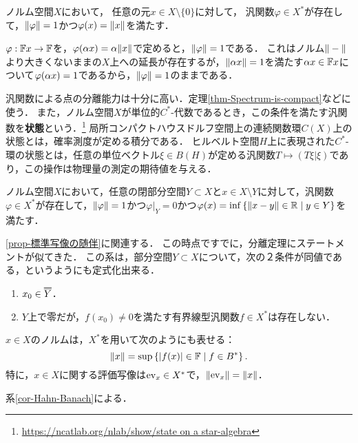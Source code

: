 \documentclass[uplatex,dvipdfmx]{jsreport}
\begin{document}
\begin{corollary}[汎関数の構成]\label{cor-Hahn-Banach}
    ノルム空間$X$において，
    任意の元$x\in X\setminus\{0\}$に対して，
    汎関数$\varphi\in X^*$が存在して，$\|\varphi\|=1$かつ$\varphi(x)=\|x\|$を満たす．
\end{corollary}
\begin{Proof}
    $\varphi:\mathbb{F} x\to\mathbb{F}$を，$\varphi(\alpha x)=\alpha\|x\|$で定めると，$\|\varphi\|=1$である．
    これはノルム$\|-\|$より大きくないままの$X$上への延長が存在するが，$\|\alpha x\|=1$を満たす$\alpha x\in\mathbb{F} x$について$\varphi(\alpha x)=1$であるから，$\|\varphi\|=1$のままである．
\end{Proof}
\begin{remarks}[state]
    汎関数による点の分離能力は十分に高い．定理\ref{thm-Spectrum-is-compact}などに使う．
    また，ノルム空間$X$が単位的$C^*$-代数であるとき，この条件を満たす汎関数を\textbf{状態}という．\footnote{\url{https://ncatlab.org/nlab/show/state on a star-algebra}}
    局所コンパクトハウスドルフ空間上の連続関数環$C(X)$上の状態とは，確率測度が定める積分である．
    ヒルベルト空間$H$上に表現された$C^*$-環の状態とは，任意の単位ベクトル$\xi\in B(H)$が定める汎関数$T\mapsto(T\xi|\xi)$であり，この操作は物理量の測定の期待値を与える．
\end{remarks}

\begin{corollary}
    ノルム空間$X$において，任意の閉部分空間$Y\subset X$と$x\in X\setminus Y$に対して，汎関数$\varphi\in X^*$が存在して，$\|\varphi\|=1$かつ$\varphi|_Y=0$かつ$\varphi(x)=\inf\left\{\|x-y\|\in\mathbb{R}\mid y\in Y\right\}$を満たす．
\end{corollary}
\begin{remarks}
    \ref{prop-標準写像の随伴}に関連する．
    この時点ですでに，分離定理にステートメントが似てきた．
    この系は，部分空間$Y\subset X$について，次の２条件が同値である，というようにも定式化出来る．
    \begin{enumerate}
        \item $x_0\in \oo{Y}$．
        \item $Y$上で零だが，$f(x_0)\ne0$を満たす有界線型汎関数$f\in X^*$は存在しない．
    \end{enumerate}
\end{remarks}

\begin{corollary}
    $x\in X$のノルムは，$X^*$を用いて次のようにも表せる：
    \[\|x\|=\sup\left\{\lvert f(x)\rvert\in\mathbb{F}\mid f\in B^*\right\}.\]
    特に，$x\in X$に関する評価写像は$\mathrm{ev}_x\in X^*$で，$\|\mathrm{ev}_x\|=\|x\|$．
\end{corollary}
\begin{Proof}
    系\ref{cor-Hahn-Banach}による．
\end{Proof}
\end{document}
